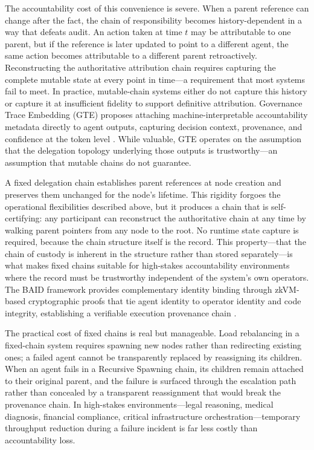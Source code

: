 The accountability cost of this convenience is severe. When a parent reference can change after the fact, the chain of responsibility becomes history-dependent in a way that defeats audit. An action taken at time $t$ may be attributable to one parent, but if the reference is later updated to point to a different agent, the same action becomes attributable to a different parent retroactively. Reconstructing the authoritative attribution chain requires capturing the complete mutable state at every point in time---a requirement that most systems fail to meet. In practice, mutable-chain systems either do not capture this history or capture it at insufficient fidelity to support definitive attribution. Governance Trace Embedding (GTE) proposes attaching machine-interpretable accountability metadata directly to agent outputs, capturing decision context, provenance, and confidence at the token level \cite{governance_trace_2026}. While valuable, GTE operates on the assumption that the delegation topology underlying those outputs is trustworthy---an assumption that mutable chains do not guarantee.

A fixed delegation chain establishes parent references at node creation and preserves them unchanged for the node's lifetime. This rigidity forgoes the operational flexibilities described above, but it produces a chain that is self-certifying: any participant can reconstruct the authoritative chain at any time by walking parent pointers from any node to the root. No runtime state capture is required, because the chain structure itself is the record. This property---that the chain of custody is inherent in the structure rather than stored separately---is what makes fixed chains suitable for high-stakes accountability environments where the record must be trustworthy independent of the system's own operators. The BAID framework provides complementary identity binding through zkVM-based cryptographic proofs that tie agent identity to operator identity and code integrity, establishing a verifiable execution provenance chain \cite{baid_2025}.

The practical cost of fixed chains is real but manageable. Load rebalancing in a fixed-chain system requires spawning new nodes rather than redirecting existing ones; a failed agent cannot be transparently replaced by reassigning its children. When an agent fails in a Recursive Spawning chain, its children remain attached to their original parent, and the failure is surfaced through the escalation path rather than concealed by a transparent reassignment that would break the provenance chain. In high-stakes environments---legal reasoning, medical diagnosis, financial compliance, critical infrastructure orchestration---temporary throughput reduction during a failure incident is far less costly than accountability loss.

